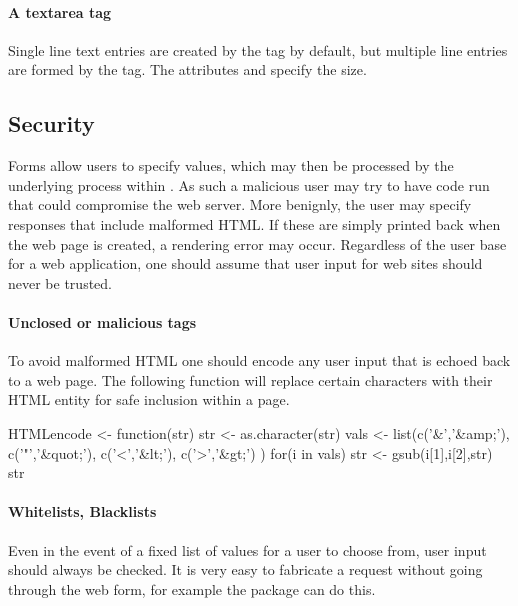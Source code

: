 \paragraph{A textarea tag}
Single line text entries are created by the  tag by
default, but multiple line entries are formed by the 
tag. The attributes  and
 specify the size.



\subsection{Security}

Forms allow users to specify values, which may then be processed
by the underlying \R\/ process within . As such a
malicious user may try to have code run that could compromise the web
server. More benignly, the user may specify responses that include
malformed HTML. If these are simply printed back when the web page is
created, a rendering error may occur. Regardless of the user base for
a web application, one should assume that user input for web sites should never be trusted.

\paragraph{Unclosed or malicious tags}
To avoid malformed HTML one should encode any user input that is
echoed back to a web page. The following function will replace certain
characters with their HTML entity for safe inclusion within a page.

\begin{Schunk}
\begin{Sinput}
 HTMLencode <- function(str) {
   str <- as.character(str)
   vals <- list(c('&','&amp;'),
                c('"','&quot;'),
                c('<','&lt;'),
                c('>','&gt;')
                )
   for(i in vals)
     str <- gsub(i[1],i[2],str)
   str
 }
\end{Sinput}
\end{Schunk}

\paragraph{Whitelists, Blacklists}
Even in the event of a fixed list of values for a user to choose from,
user input should always be checked. It is very easy to fabricate a
request without going through the web form, for example the \R\/ package
 can do this.

